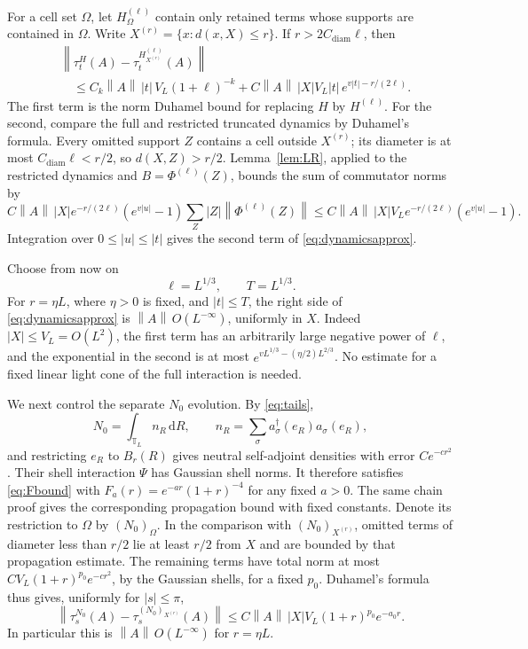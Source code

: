 \documentclass[11pt]{article}
\theoremstyle{definition}
\theoremstyle{remark}
\newcommand{\dd}{\,\mathrm d}
\newcommand{\TT}{\mathbb T}
\newcommand{\norm}[1]{\left\lVert#1\right\rVert}
\newcommand{\abs}[1]{\left|#1\right|}
\begin{document}
For a cell set \(\Omega\), let \(H_\Omega^{(\ell)}\) contain
only retained terms whose supports are contained in \(\Omega\).
Write \(X^{(r)}=\{x:d(x,X)\le r\}\).  If \(r>2C_{\mathrm{diam}}\ell\), then
\begin{equation}\label{eq:dynamicsapprox}
\begin{split}
 &\norm{\tau_t^H(A)-\tau_t^{H_{X^{(r)}}^{(\ell)}}(A)}\\
 &\quad\le C_k\norm A\,\abs t\,V_L(1+\ell)^{-k}
       +C\norm A\,|X|V_L\abs t\,
                e^{v\abs t-r/(2\ell)} .
\end{split}
\end{equation}
The first term is the norm Duhamel bound for replacing \(H\)
by \(H^{(\ell)}\).  For the second, compare the full and
restricted truncated dynamics by Duhamel's formula.  Every
omitted support \(Z\) contains a cell outside \(X^{(r)}\);
its diameter is at most \(C_{\mathrm{diam}}\ell<r/2\), so \(d(X,Z)>r/2\).
Lemma~\ref{lem:LR}, applied to the restricted dynamics and
\(B=\Phi^{(\ell)}(Z)\), bounds the sum of commutator norms by
\[
 C\norm A\,|X|e^{-r/(2\ell)}
       (e^{v\abs u}-1)
       \sum_Z|Z|\norm{\Phi^{(\ell)}(Z)}
 \le C\norm A\,|X|V_Le^{-r/(2\ell)}
       (e^{v\abs u}-1).
\]
Integration over \(0\le\abs u\le\abs t\) gives the second
term of \eqref{eq:dynamicsapprox}.

Choose from now on
\[
 \ell=L^{1/3},\qquad T=L^{1/3}.
\]
For \(r=\eta L\), where \(\eta>0\) is fixed, and
\(\abs t\le T\), the right side of \eqref{eq:dynamicsapprox}
is \(\norm A\,O(L^{-\infty})\), uniformly in \(X\).
Indeed \(|X|\le V_L=O(L^2)\), the first term has an arbitrarily
large negative power of \(\ell\), and the exponential in the
second is at most
\(e^{vL^{1/3}-(\eta/2)L^{2/3}}\).
No estimate for a fixed linear light cone of the full
interaction is needed.

We next control the separate \(N_0\) evolution.  By
\eqref{eq:tails},
\[
 N_0=\int_{\TT_L}n_R\dd R,\qquad
 n_R=\sum_\sigma a_\sigma^\dagger(e_R)a_\sigma(e_R),
\]
and restricting \(e_R\) to \(B_r(R)\) gives neutral
self-adjoint densities with error \(Ce^{-cr^2}\).
Their shell interaction \(\Psi\) has Gaussian shell norms.
It therefore satisfies \eqref{eq:Fbound} with
\(F_a(r)=e^{-ar}(1+r)^{-4}\) for any fixed \(a>0\).
The same chain proof gives the corresponding propagation
bound with fixed constants.  Denote its restriction to
\(\Omega\) by \((N_0)_\Omega\).  In the comparison with
\((N_0)_{X^{(r)}}\), omitted terms of diameter less than
\(r/2\) lie at least \(r/2\) from \(X\) and are bounded by that
propagation estimate.  The remaining terms have total norm
at most \(CV_L(1+r)^{p_0} e^{-cr^2}\), by the Gaussian shells,
for a fixed \(p_0\).  Duhamel's formula thus gives, uniformly
for \(\abs s\le\pi\),
\[
 \norm{\tau_s^{N_0}(A)-\tau_s^{(N_0)_{X^{(r)}}}(A)}
 \le C\norm A\,|X|V_L(1+r)^{p_0} e^{-a_0r}.
\]
In particular this is \(\norm A\,O(L^{-\infty})\) for
\(r=\eta L\).
\end{document}
